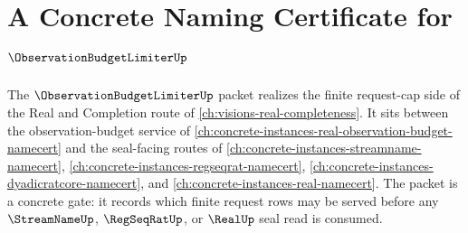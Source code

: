 \chapter{A Concrete Naming Certificate for $\ObservationBudgetLimiterUp$}
\label{ch:concrete-instances-observationbudgetlimiter-namecert}

The $\ObservationBudgetLimiterUp$ packet realizes the finite request-cap side of the Real and Completion route of \autoref{ch:visions-real-completeness}. It sits between the observation-budget service of \autoref{ch:concrete-instances-real-observation-budget-namecert} and the seal-facing routes of \autoref{ch:concrete-instances-streamname-namecert}, \autoref{ch:concrete-instances-regseqrat-namecert}, \autoref{ch:concrete-instances-dyadicratcore-namecert}, and \autoref{ch:concrete-instances-real-namecert}. The packet is a concrete gate: it records which finite request rows may be served before any $\StreamNameUp$, $\RegSeqRatUp$, or $\RealUp$ seal read is consumed.



